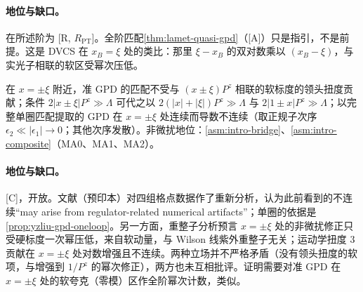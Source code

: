 
\paragraph{地位与缺口。}在所述阶为 [R, $R_{\mathrm{PT}}$]。全阶匹配\cref{thm:lamet-quasi-gpd}（[A]）只是指引，不是前提。这是 DVCS 在 $x_B=\xi$ 处的类比：那里 $\xi-x_B$ 的双对数乘以 $(x_B-\xi)$，与实光子相联的软区受幂次压低\cite{JiOsborne1998,CollinsFreund1999,Radyushkin1997}。

\begin{conjecture}[GPD 在 $x=\pm\xi$ 附近的 LaMET 可计算性 \tagC]\label{conj:yzliu-gpd-xi}
在 $x=\pm\xi$ 附近，准 GPD 的匹配不受与 $(x\pm\xi)P^z$ 相联的软标度的领头扭度贡献；条件 $2|x\pm\xi|P^z\gg\Lambda$ 可代之以 $2(|x|+|\xi|)P^z\gg\Lambda$ 与 $2|1\pm x|P^z\gg\Lambda$；以完整单圈匹配提取的 GPD 在 $x=\pm\xi$ 处连续而导数不连续（取正规子次序 $\epsilon_2\ll|\epsilon_1|\to0$；其他次序发散）\cite{Su:2026eta}。非微扰地位：\cref{asm:intro-bridge}、\cref{asm:intro-composite}（MA0、MA1、MA2）。
\end{conjecture}

\paragraph{地位与缺口。}[C]，开放。文献\cite{Su:2026eta}（预印本）对四组格点数据作了重新分析，认为此前看到的不连续“may arise from regulator-related numerical artifacts”；单圈的依据是\cref{prop:yzliu-gpd-oneloop}。另一方面，重整子分析预言 $x=\pm\xi$ 处的非微扰修正只受硬标度一次幂压低，来自软动量，与 Wilson 线紫外重整子无关\cite{Braun:2024snf}；运动学扭度 3 贡献在 $x=\pm\xi$ 处对数增强且不连续\cite{Braun:2023alc}。两种立场并不严格矛盾（没有领头扭度的软项，与增强到 $1/P^z$ 的幂次修正），两方也未互相批评。证明需要对准 GPD 在 $x=\pm\xi$ 处的软夸克（零模）区作全阶幂次计数，类似\cite{CollinsFreund1999}。
